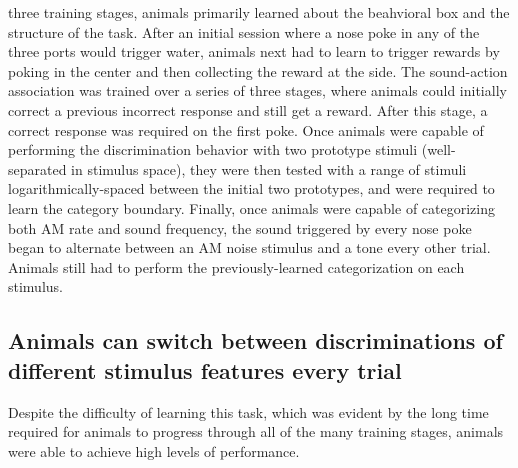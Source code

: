 \begin{table}
{    three training stages, animals primarily learned about the beahvioral box and the structure of the task. After an initial session where a nose poke in any
    of the three ports would trigger water, animals next had to learn to trigger rewards by poking in the center and then collecting the reward at the side. 
    The sound-action association was trained over a series of three stages, where animals could initially correct a previous incorrect response and still get a reward.
    After this stage, a correct response was required on the first poke. Once animals were capable of performing the discrimination behavior with two prototype stimuli
    (well-separated in stimulus space), they were then tested with a range of stimuli logarithmically-spaced between the initial two prototypes, and were required to
    learn the category boundary. Finally, once animals were capable of categorizing both AM rate and sound frequency, the sound triggered by every nose poke began to 
    alternate between an AM noise stimulus and a tone every other trial. Animals still had to perform the previously-learned categorization on each stimulus.}
\end{table}



\subsection{Animals can switch between discriminations of different stimulus
features every trial}

Despite the difficulty of learning this task, which was evident by the long
time required for animals to progress through all of the many training stages,
animals were able to achieve high levels of performance.

